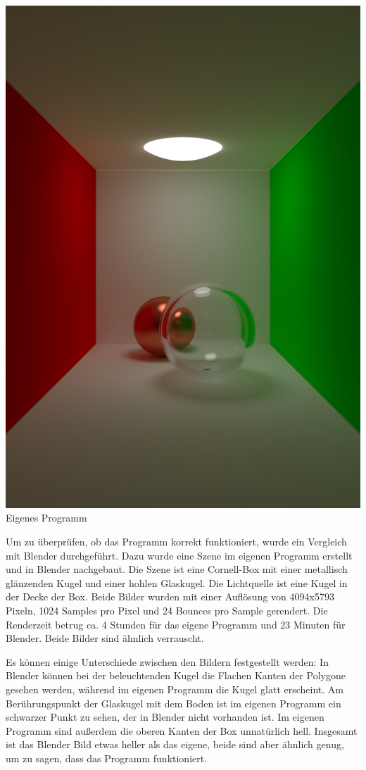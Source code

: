 \documentclass[a4paper, 10pt]{article}
\begin{document}
\begin{center}
\begin{minipage}[b]{0.45\linewidth}
    \includegraphics[width=\linewidth]{images/out_small.png}
    Eigenes Programm
\end{minipage}
\end{center}

Um zu überprüfen, ob das Programm korrekt funktioniert, wurde ein Vergleich mit Blender durchgeführt.
Dazu wurde eine Szene im eigenen Programm erstellt und in Blender nachgebaut.
Die Szene ist eine Cornell-Box mit einer metallisch glänzenden Kugel und einer hohlen Glaskugel.
Die Lichtquelle ist eine Kugel in der Decke der Box.
Beide Bilder wurden mit einer Auflösung von 4094x5793 Pixeln, 1024 Samples pro Pixel und 24 Bounces pro Sample gerendert.
Die Renderzeit betrug ca. 4 Stunden für das eigene Programm und 23 Minuten für Blender.
Beide Bilder sind ähnlich verrauscht.

Es können einige Unterschiede zwischen den Bildern festgestellt werden:
In Blender können bei der beleuchtenden Kugel die Flachen Kanten der Polygone gesehen werden, während im eigenen Programm die Kugel glatt erscheint.
Am Berührungspunkt der Glaskugel mit dem Boden ist im eigenen Programm ein schwarzer Punkt zu sehen, der in Blender nicht vorhanden ist.
Im eigenen Programm sind außerdem die oberen Kanten der Box unnatürlich hell.
Insgesamt ist das Blender Bild etwas heller als das eigene, beide sind aber ähnlich genug, um zu sagen, dass das Programm funktioniert.
\end{document}
